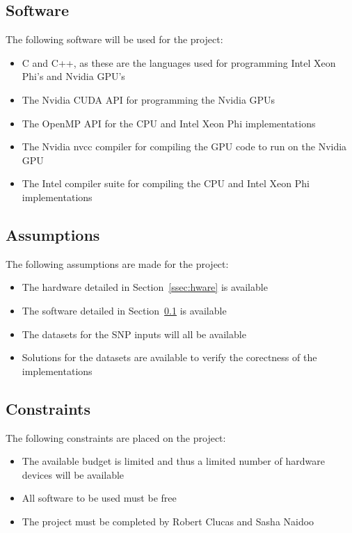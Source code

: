 \documentclass[10pt,twocolumn]{article}
\begin{document}
\subsection{Software} \label{ssec:sware}

The following software will be used for the project:
\begin{itemize}[noitemsep]
    \item{C and C++, as these are the languages used for programming Intel Xeon Phi's and Nvidia GPU's}
    \item{The Nvidia CUDA API for programming the Nvidia GPUs}
    \item{The OpenMP API for the CPU and Intel Xeon Phi implementations}
    \item{The Nvidia nvcc compiler for compiling the GPU code to run on the Nvidia GPU}
    \item{The Intel compiler suite for compiling the CPU and Intel Xeon Phi implementations}
\end{itemize}

\subsection{Assumptions}

The following assumptions are made for the project:
\begin{itemize}[noitemsep]
    \item{The hardware detailed in Section~\ref{ssec:hware} is available}
    \item{The software detailed in Section~\ref{ssec:sware} is available}
    \item{The datasets for the SNP inputs will all be available}
    \item{Solutions for the datasets are available to verify the corectness of the implementations}
\end{itemize}

\subsection{Constraints}

The following constraints are placed on the project:
\begin{itemize}[noitemsep]
    \item{The available budget is limited and thus a limited number of hardware devices will be available}
    \item{All software to be used must be free}
    \item{The project must be completed by Robert Clucas and Sasha Naidoo}
\end{itemize}
\end{document}
